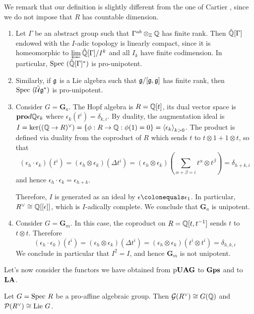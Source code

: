 We remark that our definition is slightly different from the one of Cartier \cite[end of p. 53]{cartier-ha}, since we do not impose that $R$ has countable dimension. 

\begin{exam}
\begin{enumerate}
	\item Let $\Gamma$ be an abstract group such that $\Gamma^{ab} \otimes_{\mathbb{Z}} \mathbb{Q}$ has finite rank. Then $\hat{\mathbb{Q}}[\Gamma]$ endowed with the $I$-adic topology is linearly compact, since it is homeomorphic to $\varprojlim \hat{\mathbb{Q}}[\Gamma]/I^k$ and all $I_k$ have finite codimension. In particular, $\mathrm{Spec}~(\hat{\mathbb{Q}}[\Gamma]^*)$ is pro-unipotent.
	\item Similarly, if $\mathfrak{g}$ is a Lie algebra such that $\mathfrak{g}/[\mathfrak{g},\mathfrak{g}]$ has finite rank, then $\mathrm{Spec}~(\hat{\mathcal{U}}\mathfrak{g}^*)$ is pro-unipotent.
	\item Consider $G=\mathbf{G}_a$. The Hopf algebra is $R=\mathbb{Q}[t]$, its dual vector space is ${\bf{pro}}d\mathbb{Q}\epsilon_k$ where $\epsilon_k(t^i)=\delta_{k,i}$. By duality, the augmentation ideal is $I=\ker((\mathbb{Q}\to R)^\vee)=\{\phi: R\to\mathbb{Q}: \phi(1)=0\}=\left\langle \epsilon_k\right\rangle_{k>0}$. The product is defined via duality from the coproduct of $R$ which sends $t$ to $t\otimes1 +1\otimes t$, so that
	\[
	(\epsilon_h\cdot\epsilon_k)(t^i)=(\epsilon_h\otimes\epsilon_k)(\Delta t^i)=(\epsilon_h\otimes\epsilon_k)(\sum_{\alpha+\beta=i} t^\alpha\otimes t^\beta)=\delta_{h+k,i}
	\]
	and hence $\epsilon_h\cdot\epsilon_k=\epsilon_{h+k}$.
	
	Therefore, $I$ is generated as an ideal by $\epsilon\colonequals\epsilon_1$. In particular, $R^\vee\cong\mathbb{Q}[[\epsilon]]$, which is $I$-adically complete. We conclude that $\mathbf{G}_a$ is unipotent.
	
	\item Consider $G=\mathbf{G}_m$. In this case, the coproduct on $R=\mathbb{Q}[t,t^{-1}]$ sends $t$ to $t\otimes t$. Therefore
	\[
	(\epsilon_h\cdot\epsilon_k)(t^i)=(\epsilon_h\otimes\epsilon_k)(\Delta t^i)=(\epsilon_h\otimes\epsilon_k)(t^i\otimes t^i)=\delta_{h,k,i}
	\]
	We conclude in particular that $I^2=I$, and hence $\mathbf{G}_m$ is not unipotent.
\end{enumerate}
\end{exam}

Let's now consider the functors we have obtained from $\operatorname{p\bf{UAG}}$ to $\operatorname{\bf{Gps}}$ and to $\operatorname{\bf{LA}}$.
\begin{prop}
Let $G=\mathrm{Spec}~ R$ be a pro-affine algebraic group. Then $\mathcal{G} (R^\vee)\cong G(\mathbb{Q})$ and $\mathcal{P}(R^\vee)\cong\mathrm{Lie~} G$. 
\end{prop}

